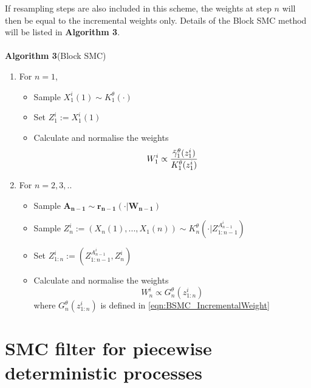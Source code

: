 \documentclass[12pt,a4paper]{article}
\begin{document}
If resampling steps are also included in this scheme, the weights at step $n$ will then be equal to the incremental weights only. Details of the Block SMC method will be listed in \textbf{Algorithm 3}.  
\\\\
\textbf{Algorithm 3}(Block SMC)
\begin{enumerate}
    \item For $n=1$,
    \begin{itemize}
        \item Sample $X_1^i(1) \sim K_1^{\theta}(\cdot)$
        \item Set $Z_1^i := X_1^i(1)$
        \item Calculate and normalise the weights
        $$W_1^i \propto \frac{\Tilde{\gamma}_1^{\theta}(z_1^i)}{K_1^{\theta}(z_1^i)}$$
    \end{itemize}
    \item For $n = 2,3,..$
    \begin{itemize}
        \item Sample $\mathbf{A_{n-1}} \sim \mathbf{r_{n-1}}(\cdot|\mathbf{W_{n-1}})$
        \item Sample $Z_{n}^i:=(X_n(1),...,X_1(n)) \sim K_n^{\theta}(\cdot|Z_{1:n-1}^{A_{n-1}^i})$
        \item Set $Z_{1:n}^i := \left(Z_{1:n-1}^{A_{n-1}^i},Z_n^i\right)$
        \item Calculate and normalise the weights 
        $$W_n^i \propto G_n^{\theta}(z_{1:n}^i)$$
        where $G_n^{\theta}(z_{1:n}^i)$ is defined in \eqref{eqn:BSMC_IncrementalWeight}
        
    \end{itemize}
\end{enumerate}
\section{SMC filter for piecewise deterministic processes}
\end{document}
